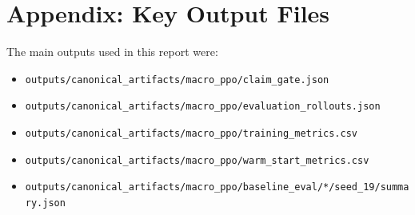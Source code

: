 \documentclass[11pt]{article}
\begin{document}
\section*{Appendix: Key Output Files}
The main outputs used in this report were:
\begin{itemize}[leftmargin=1.5em]
    \item \texttt{outputs/canonical\_artifacts/macro\_ppo/claim\_gate.json}
    \item \texttt{outputs/canonical\_artifacts/macro\_ppo/evaluation\_rollouts.json}
    \item \texttt{outputs/canonical\_artifacts/macro\_ppo/training\_metrics.csv}
    \item \texttt{outputs/canonical\_artifacts/macro\_ppo/warm\_start\_metrics.csv}
    \item \texttt{outputs/canonical\_artifacts/macro\_ppo/baseline\_eval/*/seed\_19/summary.json}
\end{itemize}
\end{document}
